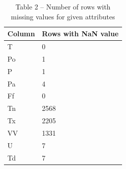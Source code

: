 \begin{table}[H]
\caption*{Table 2 -- Number of rows with missing values for given attributes}
\centering
\begin{tabular}{|l|l|}
\hline
Column & Rows 				with NaN value \\ \hline
T      & 0                       \\ \hline
Po     & 1                       \\ \hline
P      & 1                       \\ \hline
Pa     & 4                       \\ \hline
Ff     & 0                       \\ \hline
Tn     & 2568                    \\ \hline
Tx     & 2205                    \\ \hline
VV     & 1331                    \\ \hline
U      & 7                       \\ \hline
Td     & 7                       \\ \hline
\end{tabular}
\end{table}

